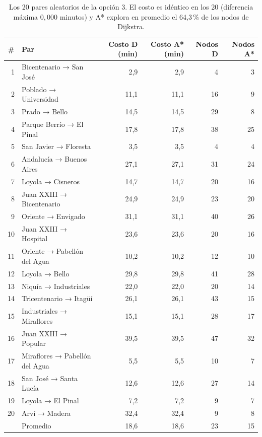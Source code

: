 \documentclass[11pt,a4paper]{article}
\begin{document}
\begin{table}[htbp]
\centering
\footnotesize
\begin{tabular}{rlrrrr}
\toprule
\# & Par & Costo D (min) & Costo A* (min) & Nodos D & Nodos A* \\
\midrule
 1 & Bicentenario → San José     &  2,9 &  2,9 &  4 &  3 \\
 2 & Poblado → Universidad       & 11,1 & 11,1 & 16 &  9 \\
 3 & Prado → Bello               & 14,5 & 14,5 & 29 &  8 \\
 4 & Parque Berrío → El Pinal    & 17,8 & 17,8 & 38 & 25 \\
 5 & San Javier → Floresta       &  3,5 &  3,5 &  4 &  4 \\
 6 & Andalucía → Buenos Aires    & 27,1 & 27,1 & 31 & 24 \\
 7 & Loyola → Cisneros           & 14,7 & 14,7 & 20 & 16 \\
 8 & Juan XXIII → Bicentenario   & 24,9 & 24,9 & 23 & 20 \\
 9 & Oriente → Envigado          & 31,1 & 31,1 & 40 & 26 \\
10 & Juan XXIII → Hospital       & 23,6 & 23,6 & 20 & 16 \\
11 & Oriente → Pabellón del Agua & 10,2 & 10,2 & 12 & 10 \\
12 & Loyola → Bello              & 29,8 & 29,8 & 41 & 28 \\
13 & Niquía → Industriales       & 22,0 & 22,0 & 20 & 14 \\
14 & Tricentenario → Itagüí      & 26,1 & 26,1 & 43 & 15 \\
15 & Industriales → Miraflores   & 15,1 & 15,1 & 28 & 17 \\
16 & Juan XXIII → Popular        & 39,5 & 39,5 & 47 & 32 \\
17 & Miraflores → Pabellón del Agua & 5,5 & 5,5 & 10 & 7 \\
18 & San José → Santa Lucía      & 12,6 & 12,6 & 27 & 14 \\
19 & Loyola → El Pinal           &  7,2 &  7,2 &  9 &  7 \\
20 & Arví → Madera               & 32,4 & 32,4 &  9 &  8 \\
\midrule
   & Promedio                    & 18,6 & 18,6 & 23 & 15 \\
\bottomrule
\end{tabular}
\caption{Los 20 pares aleatorios de la opción 3. El costo es idéntico en los 20 (diferencia máxima $0{,}000$ minutos) y A* explora en promedio el 64,3\,\% de los nodos de Dijkstra.}
\label{tab:astar}
\end{table}
\end{document}
